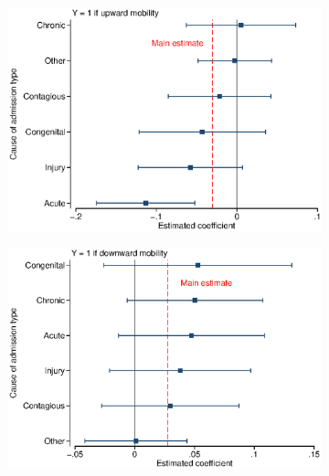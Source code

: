 \documentclass[12pt,english]{article}
\begin{document}
\begin{figure}[!ht]
\caption[Effects of hospitalization by hospital admission type]{Effects of hospitalization by hospital admission type}
\centering
\begin{subfigure}{0.49\textwidth}
	\centering
	\includegraphics[width=1.00\linewidth]{../output/02_appendix/figure_a10_panel_1.eps}
\end{subfigure}
\begin{subfigure}{0.49\textwidth}
	\centering
	\includegraphics[width=1.00\linewidth]{../output/02_appendix/figure_a10_panel_2.eps}
\end{subfigure}
\begin{subfigure}{0.49\textwidth}
	\centering

\end{subfigure}
\end{figure}
\end{document}
